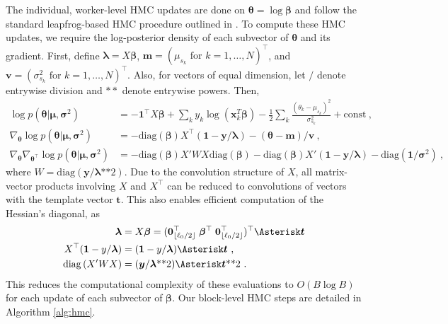 \documentclass[12pt]{article}
\newcommand{\diag}[1]{\mathrm{diag}\left(#1\right)}
\begin{document}
The individual, worker-level HMC updates are done on $\bm \theta = \log \bm \beta$ and follow the standard leapfrog-based HMC procedure outlined in \citet{Neal2010}.
To compute these HMC updates, we require the log-posterior density of each subvector of $\bm \theta$ and its gradient.
First, define $\bm \lambda = X \bm \beta$, $\bm m = (\mu_{s_k} \mbox{ for } k = 1, \ldots, N)^\top$, and $\bm v = (\sigma^2_{s_k} \mbox{ for } k = 1, \ldots, N)^\top$.
Also, for vectors of equal dimension, let $/$ denote entrywise division and $**$ denote entrywise powers.
Then,
\begin{align}
\log p(\bm \theta | \bm \mu, \bm \sigma^2) &= -\bm 1^\top X \bm \beta + \sum_k y_k \log \left( \bm x_k^T \bm \beta \right) -
  \frac{1}{2} \sum_k \frac{(\theta_k - \mu_{s_k})^2}{\sigma^2_{s_k}}
  + \mathrm{const} \ , \\
\nabla_{\bm \theta} \log p(\bm \theta | \bm \mu, \bm \sigma^2) &= -\diag{\bm \beta} X^\top (\bm 1 - \bm y / \bm \lambda) - (\bm \theta - \bm m) / \bm v \ , \\
\nabla_{\bm \theta} \nabla_{\bm \theta^\top} \log p(\bm \theta | \bm \mu, \bm \sigma^2) &= -\diag{\bm \beta} X'WX \diag{\bm \beta} - \diag{\bm \beta} X' (\bm 1 - \bm y
/ \bm \lambda) - \diag{\bm 1 / \bm \sigma^2} \label{eq:hessian} \ ,
\end{align}
where $W = \diag{\bm y / \bm \lambda\mbox{**}2}$.
Due to the convolution structure of $X$, all matrix-vector products involving $X$ and $X^\top$ can be reduced to convolutions of vectors with the template vector $\bm t$.
This also enables efficient computation of the Hessian's diagonal, as
\begin{align}
\bm \lambda &= X \bm \beta = (\bm 0_{\lfloor \ell_0 / 2 \rfloor}^\top \; \bm \beta^\top \; \bm 0_{\lfloor \ell_0 / 2 \rfloor}^\top)^\top \Asterisk \bm t \\
X^\top (\bm 1 - y / \bm \lambda) &= (\bm 1 - y / \bm \lambda) \Asterisk \bm t \ , \\
\diag{X'WX} &= (\bm y / \bm \lambda\mbox{**}2) \Asterisk \bm t\mbox{**}2 \ .
\end{align}
%
This reduces the computational complexity of these evaluations to $O(B \log B)$ for each update of each subvector of $\bm \beta$.
Our block-level HMC steps are detailed in Algorithm \ref{alg:hmc}.
%
\end{document}
